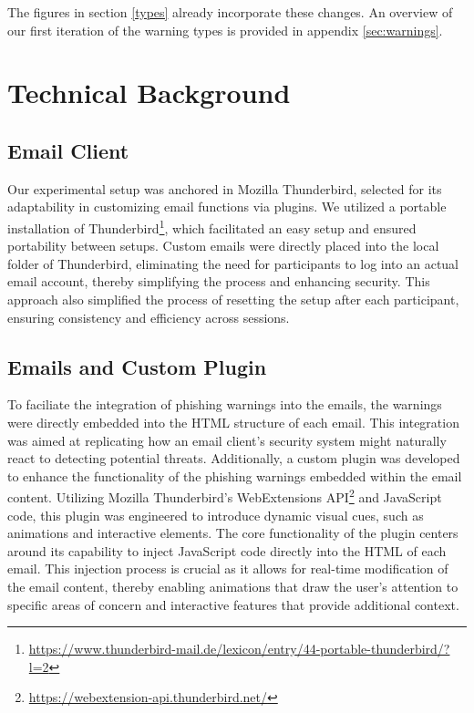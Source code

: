 \documentclass[
  a4paper,  %
  twoside,  %
  bibliography=totoc,
  headsepline,
  cleardoublepage=empty,
  parskip=half,
  draft=false
]{scrbook}
\begin{document}
The figures in section \ref{types} already incorporate these changes. An overview of our first iteration of the warning types is provided in appendix \ref{sec:warnings}.

\section{Technical Background}
\subsection{Email Client}
Our experimental setup was anchored in Mozilla Thunderbird, selected for its adaptability in customizing email functions via plugins. We utilized a portable installation of Thunderbird\footnote{\href{https://www.thunderbird-mail.de/lexicon/entry/44-portable-thunderbird/?l=2}{https://www.thunderbird-mail.de/lexicon/entry/44-portable-thunderbird/?l=2}}, which facilitated an easy setup and ensured portability between setups. Custom emails were directly placed into the local folder of Thunderbird, eliminating the need for participants to log into an actual email account, thereby simplifying the process and enhancing security. This approach also simplified the process of resetting the setup after each participant, ensuring consistency and efficiency across sessions.

\subsection{Emails and Custom Plugin}
To faciliate the integration of phishing warnings into the emails, the warnings were directly embedded into the HTML structure of each email. This integration was aimed at replicating how an email client's security system might naturally react to detecting potential threats.\newline
Additionally, a custom plugin was developed to enhance the functionality of the phishing warnings embedded within the email content. Utilizing Mozilla Thunderbird's WebExtensions API\footnote{ \href{https://webextension-api.thunderbird.net/}{https://webextension-api.thunderbird.net/}} and JavaScript code, this plugin was engineered to introduce dynamic visual cues, such as animations and interactive elements.
The core functionality of the plugin centers around its capability to inject JavaScript code directly into the HTML of each email. This injection process is crucial as it allows for real-time modification of the email content, thereby enabling animations that draw the user's attention to specific areas of concern and interactive features that provide additional context.
\end{document}
